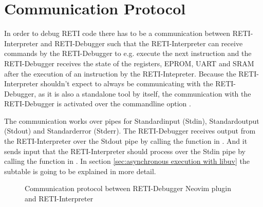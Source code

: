 \documentclass{report}
\begin{document}

\section{Communication Protocol}
\label{sec:communication protocol}


\sloppy

In order to debug RETI code there has to be a communication between RETI-Interpreter and RETI-Debugger such that the RETI-Interpreter can receive commands by the RETI-Debugger to e.g. execute the next instruction and the RETI-Debugger receives the state of the registers, EPROM, UART and SRAM after the execution of an instruction by the RETI-Intepreter. Because the RETI-Interpreter shouldn't expect to always be communicating with the RETI-Debugger, as it is also a standalone tool by itself, the communication with the RETI-Debugger is activated over the commandline option .

The communication works over \alert{pipes} for Standardinput (\alert{Stdin}), Standardoutput (\alert{Stdout}) and Standarderror (\alert{Stderr}). The RETI-Debugger receives output from the RETI-Interpreter over the Stdout pipe by calling the  function in . And it sends input that the RETI-Interpreter should process over the Stdin pipe by calling the  function in . In section \ref{sec:asynchronous execution with libuv}  the subtable  is going to be explained in more detail.

\begin{figure}
	\centering
	\caption{Communication protocol between RETI-Debugger Neovim plugin and RETI-Interpreter}
	\label{fig:communication reti debugger and reti interpreter}
  \vspace{-0.5cm}
\end{figure}
\end{document}
